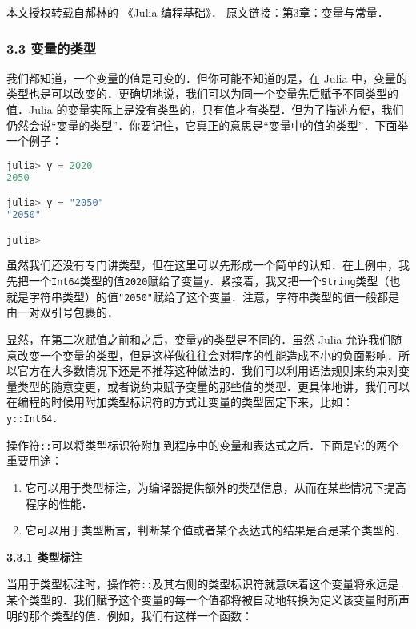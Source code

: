 
本文授权转载自郝林的 《Julia 编程基础》． 原文链接：\href{https://github.com/hyper0x/JuliaBasics/blob/master/book/ch03.md}{第3章：变量与常量}．


\subsubsection{3.3 变量的类型}

我们都知道，一个变量的值是可变的．但你可能不知道的是，在 Julia 中，变量的类型也是可以改变的．更确切地说，我们可以为同一个变量先后赋予不同类型的值．Julia 的变量实际上是没有类型的，只有值才有类型．但为了描述方便，我们仍然会说“变量的类型”．你要记住，它真正的意思是“变量中的值的类型”．下面举一个例子：

\begin{lstlisting}[language=julia]
julia> y = 2020
2050

julia> y = "2050"
"2050"

julia> 
\end{lstlisting}

虽然我们还没有专门讲类型，但在这里可以先形成一个简单的认知．在上例中，我先把一个\verb|Int64|类型的值\verb|2020|赋给了变量\verb|y|．紧接着，我又把一个\verb|String|类型（也就是字符串类型）的值\verb|"2050"|赋给了这个变量．注意，字符串类型的值一般都是由一对双引号包裹的．

显然，在第二次赋值之前和之后，变量\verb|y|的类型是不同的．虽然 Julia 允许我们随意改变一个变量的类型，但是这样做往往会对程序的性能造成不小的负面影响．所以官方在大多数情况下还是不推荐这种做法的．我们可以利用语法规则来约束对变量类型的随意变更，或者说约束赋予变量的那些值的类型．更具体地讲，我们可以在编程的时候用附加类型标识符的方式让变量的类型固定下来，比如：\verb|y::Int64|．

操作符\verb|::|可以将类型标识符附加到程序中的变量和表达式之后．下面是它的两个重要用途：

\begin{enumerate}
\item 它可以用于类型标注，为编译器提供额外的类型信息，从而在某些情况下提高程序的性能．
\item 它可以用于类型断言，判断某个值或者某个表达式的结果是否是某个类型的．
\end{enumerate}

\textbf{3.3.1 类型标注}

当用于类型标注时，操作符\verb|::|及其右侧的类型标识符就意味着这个变量将永远是某个类型的．我们赋予这个变量的每一个值都将被自动地转换为定义该变量时所声明的那个类型的值．例如，我们有这样一个函数：

